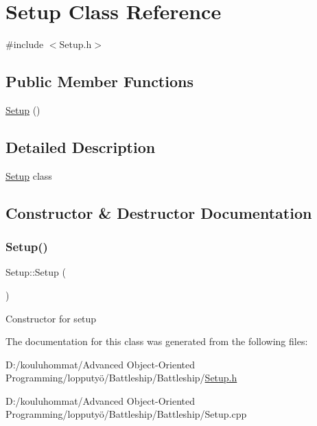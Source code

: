 \hypertarget{class_setup}{}\section{Setup Class Reference}
\label{class_setup}


{\ttfamily \#include $<$Setup.\+h$>$}

\subsection*{Public Member Functions}
\begin{DoxyCompactItemize}
\item 
\mbox{\hyperlink{class_setup_a0921e54e5a0200af117192e4c0c845b7}{Setup}} ()
\end{DoxyCompactItemize}


\subsection{Detailed Description}
\mbox{\hyperlink{class_setup}{Setup}} class 

\subsection{Constructor \& Destructor Documentation}
\mbox{\label{class_setup_a0921e54e5a0200af117192e4c0c845b7}} 
\subsubsection{\texorpdfstring{Setup()}{Setup()}}
{\footnotesize\ttfamily Setup\+::\+Setup (\begin{DoxyParamCaption}{ }\end{DoxyParamCaption})}

Constructor for setup 

The documentation for this class was generated from the following files\+:\begin{DoxyCompactItemize}
\item 
D\+:/kouluhommat/\+Advanced Object-\/\+Oriented Programming/lopputyö/\+Battleship/\+Battleship/\mbox{\hyperlink{_setup_8h}{Setup.\+h}}\item 
D\+:/kouluhommat/\+Advanced Object-\/\+Oriented Programming/lopputyö/\+Battleship/\+Battleship/Setup.\+cpp\end{DoxyCompactItemize}
